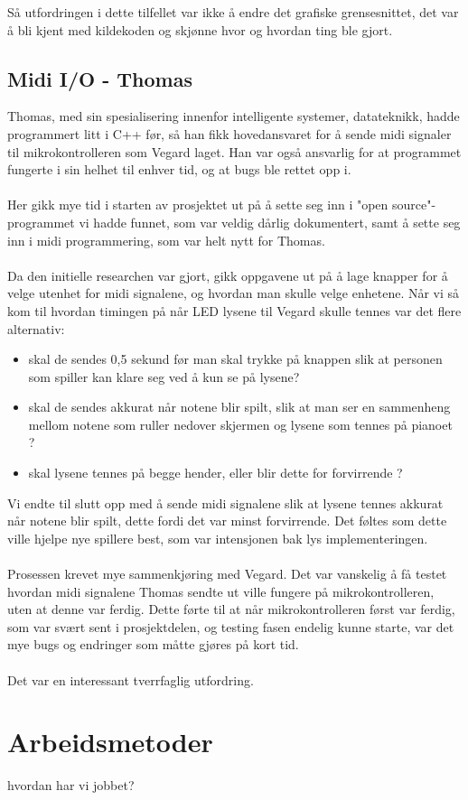 Så utfordringen i dette tilfellet var ikke å endre det grafiske grensesnittet, det var å bli kjent med kildekoden og skjønne hvor og hvordan ting ble gjort. 

\subsection{Midi I/O - Thomas}
Thomas, med sin spesialisering innenfor intelligente systemer, datateknikk, hadde programmert litt i C++ før, så han fikk hovedansvaret for å sende midi signaler til mikrokontrolleren som Vegard laget. Han var også ansvarlig for at programmet fungerte i sin helhet til enhver tid, og at bugs ble rettet opp i.\\\\
Her gikk mye tid i starten av prosjektet ut på å sette seg inn i "open source"-programmet vi hadde funnet, som var veldig dårlig dokumentert, samt å sette seg inn i midi programmering, som var helt nytt for Thomas.\\\\
Da den initielle researchen var gjort, gikk oppgavene ut på å lage knapper for å velge utenhet for midi signalene, og hvordan man skulle velge enhetene.
Når vi så kom til hvordan timingen på når LED lysene til Vegard skulle tennes var det flere alternativ:\\
\begin{itemize}
\item 
skal de sendes 0,5 sekund før man skal trykke på knappen slik at personen som spiller kan klare seg ved å kun se på lysene?
\item
skal de sendes akkurat når notene blir spilt, slik at man ser en sammenheng mellom notene som ruller nedover skjermen og lysene som tennes på pianoet ?
\item
skal lysene tennes på begge hender, eller blir dette for forvirrende ?
\end{itemize}
Vi endte til slutt opp med å sende midi signalene slik at lysene tennes akkurat når notene blir spilt, dette fordi det var minst forvirrende. Det føltes som dette ville hjelpe nye spillere best, som var intensjonen bak lys implementeringen.\\\\
Prosessen krevet mye sammenkjøring med Vegard. Det var vanskelig å få testet hvordan midi signalene Thomas sendte ut ville fungere på mikrokontrolleren, uten at denne var ferdig. Dette førte til at når mikrokontrolleren først var ferdig, som var svært sent i prosjektdelen, og testing fasen endelig kunne starte, var det mye bugs og endringer som måtte gjøres på kort tid.\\\\
Det var en interessant tverrfaglig utfordring.

\section{Arbeidsmetoder}
hvordan har vi jobbet?
